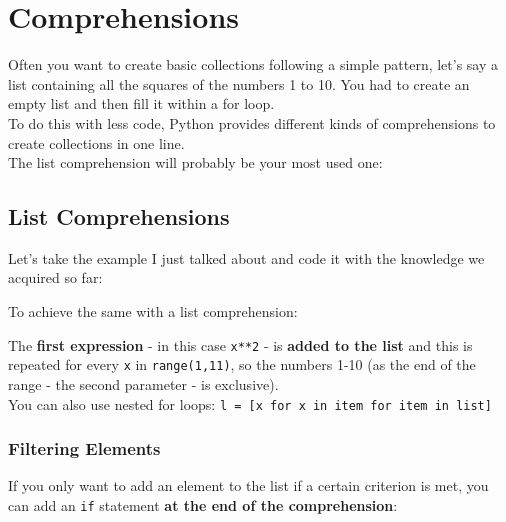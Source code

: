 \section{Comprehensions}

    Often you want to create basic collections following a simple pattern, let's say a list
    containing all the squares of the numbers 1 to 10. You had to create an empty list and then
    fill it within a for loop. \\
    To do this with less code, Python provides different kinds of comprehensions to create
    collections in one line. \\
    The list comprehension will probably be your most used one:

    \subsection{List Comprehensions}

        Let's take the example I just talked about and code it with the knowledge we
        acquired so far:


        To achieve the same with a list comprehension:


        The \textbf{first expression} - in this case \texttt{x**2} -
        is \textbf{added to the list} and this is repeated for every \texttt{x} in
        \texttt{range(1,11)}, so the numbers 1-10 (as the end of the range -
        the second parameter - is exclusive). \\
        You can also use nested for loops:
        \texttt{l = [x for x in item for item in list]}

        \subsubsection{Filtering Elements}

            If you only want to add an element to the list if a certain criterion is met, you can add
            an \texttt{if} statement \textbf{at the end of the comprehension}:


